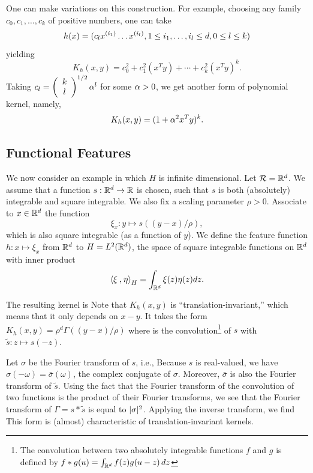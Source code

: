 One can make variations on this construction. For example, choosing any family $c_0, c_1, \ldots, c_k$ of positive numbers, one can take 
\[
h(x) = (c_l x^{(i_1)} \dots x^{(i_l)}, 1\leq i_1, \ldots, i_l \leq d, 0\leq l\leq k)
\]
yielding
\[
K_h(x,y) = c_0^2 + c_1^2 (x^Ty) + \cdots + c_k^2 (x^Ty)^k.
\]
Taking $c_l = \left(\begin{array}{c} k\\l\end{array} \right)^{1/2} \alpha^{l}$ for some $\alpha>0$, we get another form of polynomial kernel, namely,
\[
K_h(x,y) = (1 + \alpha^2 x^T y)^k.
\]

\subsection{Functional Features}
\label{sec:functional.feat}
We now consider an example in which $H$ is infinite dimensional.
Let ${\mathcal R} = {\mathbb{R}}^d$. We assume that a  function $s: {\mathbb{R}}^d \to {\mathbb{R}}$ is chosen, such that $s$ is both (absolutely) integrable and square integrable. We also fix a scaling parameter $\rho>0$. Associate to $x\in {\mathbb{R}}^d$ the function 
\[
\xi_x: y \mapsto s((y-x)/\rho),
\] 
which is also square integrable (as a function of $y$). We define the feature function $h: x\mapsto \xi_x$ from ${\mathbb{R}}^d$ to $H = L^2({\mathbb{R}}^d)$, the space of square integrable functions on ${\mathbb{R}}^d$ with inner product 
\[
{\langle {\xi}\mathbin{,} {\eta}\rangle}_H = \int_{{\mathbb{R}}^d} \xi(z)\eta(z) dz.
\]

The resulting kernel is
Note that $K_h(x,y)$ is ``translation-invariant,'' which means that it only depends on $x-y$. It takes the form $K_h(x,y) = \rho^d \Gamma((y-x)/\rho)$ where
is  the convolution\footnote{The convolution between two absolutely integrable functions $f$ and $g$ is defined by $f*g(u) = \int_{{\mathbb{R}}^d} f(z) g(u-z)\,dz$} of $s$ with $\tilde s: z\mapsto s(-z)$.


Let $\sigma$ be the Fourier transform of $s$, i.e., 
Because $s$ is real-valued, we have $\sigma(-\omega) = \bar \sigma(\omega) $, the complex conjugate of $\sigma$. Moreover,
$\bar \sigma$ is also the Fourier transform of $\tilde s$. Using the fact that the Fourier transform of the convolution of two functions is the product of their Fourier transforms, we see that the Fourier transform of $\Gamma = s * \tilde s$ is equal to $|\sigma|^2$. 
Applying the inverse transform, we find
This form is (almost) characteristic of translation-invariant kernels.
\bigskip

